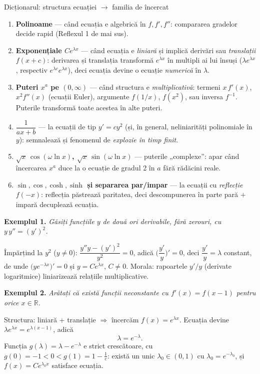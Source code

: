 \begin{tehbox}{Dicționarul: structura ecuației $\to$ familia de încercat}
\begin{enumerate}[leftmargin=*, itemsep=1pt]
\item \textbf{Polinoame} --- când ecuația e algebrică în $f,f',f''$: compararea gradelor decide rapid (Reflexul 1 de mai sus).
\item \textbf{Exponențiale $Ce^{\lambda x}$} --- când ecuația e \emph{liniară} și implică derivări sau \emph{translații} $f(x+c)$: derivarea și translația transformă $e^{\lambda x}$ în multipli ai lui însuși ($\lambda e^{\lambda x}$, respectiv $e^{\lambda c}e^{\lambda x}$), deci ecuația devine o ecuație \emph{numerică} în $\lambda$.
\item \textbf{Puteri $x^a$ pe $(0,\infty)$} --- când structura e \emph{multiplicativă}: termeni $x\,f'(x)$, $x^2f''(x)$ (ecuații Euler), argumente $f(1/x)$, $f(x^2)$, sau inversa $f^{-1}$. Puterile transformă toate acestea în alte puteri.
\item \textbf{$\dfrac{1}{ax+b}$} --- la ecuații de tip $y'=cy^2$ (și, în general, neliniarități polinomiale în $y$): semnalează și fenomenul de \emph{explozie în timp finit}.
\item \textbf{$\sqrt x\,\cos(\omega\ln x)$, $\sqrt x\,\sin(\omega\ln x)$} --- puterile „complexe'': apar când încercarea $x^a$ duce la o ecuație de gradul 2 în $a$ fără rădăcini reale.
\item \textbf{$\sin,\cos,\cosh,\sinh$ și separarea par/impar} --- la ecuații cu \emph{reflecție} $f(-x)$: reflecția păstrează paritatea, deci descompunerea în parte pară $+$ impară decuplează ecuația.
\end{enumerate}
\end{tehbox}

\textbf{Exemplul 1.} \emph{Găsiți funcțiile $y$ de două ori derivabile, fără zerouri, cu $y\,y''=(y')^2$.}

Împărțind la $y^2$ ($y\neq0$): $\dfrac{y''y-(y')^2}{y^2}=0$, adică $\Big(\dfrac{y'}{y}\Big)'=0$, deci $\dfrac{y'}{y}=\lambda$ constant, de unde $\big(ye^{-\lambda x}\big)'=0$ și $y=Ce^{\lambda x}$, $C\neq0$. Morala: rapoartele $y'/y$ (derivate logaritmice) liniarizează relațiile multiplicative.

\medskip
\textbf{Exemplul 2.} \emph{Arătați că există funcții neconstante cu $f'(x)=f(x-1)$ pentru orice $x\in\mathbb{R}$.}

Structura: liniară + translație $\Rightarrow$ încercăm $f(x)=e^{\lambda x}$. Ecuația devine $\lambda e^{\lambda x}=e^{\lambda(x-1)}$, adică
\[
\lambda=e^{-\lambda}.
\]
Funcția $g(\lambda)=\lambda-e^{-\lambda}$ e strict crescătoare, cu $g(0)=-1<0<g(1)=1-\frac1e$: există un unic $\lambda_0\in(0,1)$ cu $\lambda_0=e^{-\lambda_0}$, și $f(x)=Ce^{\lambda_0x}$ satisface ecuația. 


